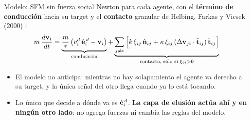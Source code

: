 \documentclass[aspectratio=169,11pt]{beamer}
\begin{document}
\begin{frame}{Modelo: SFM sin fuerza social}
    \vspace{-0.3em}
    \small
    \setlength{\abovedisplayskip}{5pt}\setlength{\belowdisplayskip}{5pt}
    Newton para cada agente, con el \textbf{término de conducción} hacia su target y el
    \textbf{contacto} granular de Helbing, Farkas y Vicsek (2000) :
    \[
        m\,\frac{d\mathbf{v}_i}{dt}
        = \underbrace{\frac{m}{\tau}\left(v_i^{d}\,\hat{\mathbf{e}}_i^{\,d} - \mathbf{v}_i\right)}_{\text{conducción}}
        + \underbrace{\sum_{j \ne i}\Big[k\,\xi_{ij}\,\hat{\mathbf{n}}_{ij}
          + \kappa\,\xi_{ij}\,(\Delta\mathbf{v}_{ji}\cdot\hat{\mathbf{t}}_{ij})\,\hat{\mathbf{t}}_{ij}\Big]}_{\text{contacto, sólo si } \xi_{ij} > 0}
    \]
    \vspace{-0.4em}
    \begin{center}
        \resizebox{0.70\textwidth}{!}{}
    \end{center}
    \vspace{-0.5em}
    {\footnotesize
    \begin{itemize}\setlength{\itemsep}{0.25em}
        \item \alert{El modelo no anticipa}: mientras no hay solapamiento el
              agente va derecho a su target, y la única señal del otro llega
              cuando ya lo está tocando.
        \item Lo único que decide a dónde va es $\hat{\mathbf{e}}_i^{\,d}$. \textbf{La capa
              de elusión actúa ahí y en ningún otro lado}: no agrega fuerzas ni
              cambia las reglas del modelo.
    \end{itemize}}
\end{frame}
\end{document}

